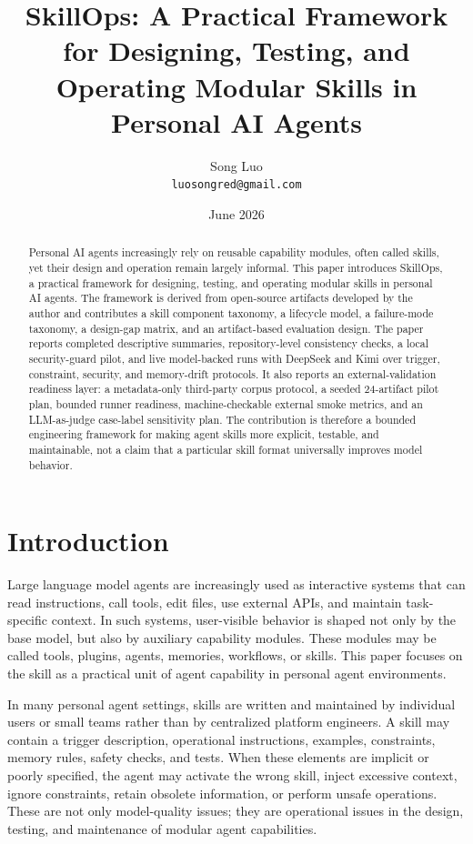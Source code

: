 \documentclass[11pt]{article}
\title{
SkillOps: A Practical Framework for Designing, Testing, and Operating
Modular Skills in Personal AI Agents
}
\author{
Song Luo\\
\texttt{luosongred@gmail.com}
}
\date{June 2026}
\begin{document}
\maketitle

\begin{abstract}
Personal AI agents increasingly rely on reusable capability modules, often
called skills, yet their design and operation remain largely informal. This
paper introduces SkillOps, a practical framework for designing, testing, and
operating modular skills in personal AI agents. The framework is derived from
open-source artifacts developed by the author and contributes a skill component
taxonomy, a lifecycle model, a failure-mode taxonomy, a design-gap matrix, and
an artifact-based evaluation design. The paper reports completed descriptive
summaries, repository-level consistency checks, a local security-guard pilot,
and live model-backed runs with DeepSeek and Kimi over trigger, constraint,
security, and memory-drift protocols. It also reports an external-validation
readiness layer: a metadata-only third-party corpus protocol, a seeded
24-artifact pilot plan, bounded runner readiness, machine-checkable external
smoke metrics, and an LLM-as-judge case-label sensitivity plan. The
contribution is therefore a bounded engineering
framework for making agent skills more explicit, testable, and maintainable,
not a claim that a particular skill format universally improves model behavior.
\end{abstract}

\section{Introduction}

Large language model agents are increasingly used as interactive systems that
can read instructions, call tools, edit files, use external APIs, and maintain
task-specific context. In such systems, user-visible behavior is shaped not
only by the base model, but also by auxiliary capability modules. These modules
may be called tools, plugins, agents, memories, workflows, or skills. This
paper focuses on the skill as a practical unit of agent capability in personal
agent environments.

In many personal agent settings, skills are written and maintained by
individual users or small teams rather than by centralized platform engineers.
A skill may contain a trigger description, operational instructions, examples,
constraints, memory rules, safety checks, and tests. When these elements are
implicit or poorly specified, the agent may activate the wrong skill, inject
excessive context, ignore constraints, retain obsolete information, or perform
unsafe operations. These are not only model-quality issues; they are
operational issues in the design, testing, and maintenance of modular agent
capabilities.
\end{document}
